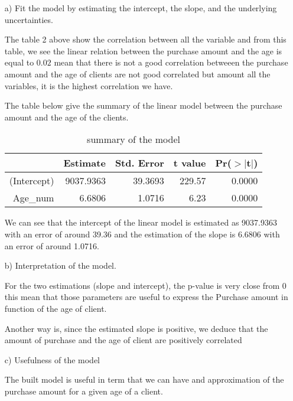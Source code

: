 \documentclass[11pt,a4paper]{article}
\begin{document}
\begin{enumerate}
	 
\item[a)] Fit the model by estimating the intercept, the slope, and the underlying
uncertainties.


The table 2 above show the correlation between all the variable and from this table, we see the linear relation between the purchase amount and the age is equal to $0.02$ mean that there is not a good correlation betweeen the purchase amount and the age of clients are not good correlated but amount all the variables, it is the highest correlation we have.

The table below give the summary of the linear model between the purchase amount and the age of the clients.

\begin{table}[h!]
	\caption{summary of the model}
	\centering
	\begin{tabular}{rrrrr}
		\hline
		& Estimate & Std. Error & t value & Pr($>$$|$t$|$) \\ 
		\hline
		(Intercept) & 9037.9363 & 39.3693 & 229.57 & 0.0000 \\ 
		Age\_num & 6.6806 & 1.0716 & 6.23 & 0.0000 \\ 
		\hline
	\end{tabular}

\end{table}	

We can see that the intercept of the linear model is estimated as 9037.9363 with an error of around 39.36 and the estimation of the slope is 6.6806 with an error of around 1.0716.



\item[b)] Interpretation of the model.


For the two estimations (slope and intercept), the p-value is  very close from 0 this mean that those parameters are useful to express the Purchase amount in function of the age of client. 

Another way is, since the estimated slope is positive, we deduce that the amount of purchase and the age of client are positively correlated

\item[c)] Usefulness of the model

The built model is useful in term that we can have and approximation of the purchase amount for a given age of a client. 



\end{enumerate}
\end{document}
